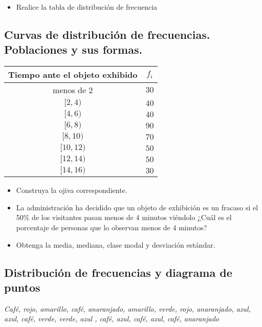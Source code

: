 \documentclass{../oxmathproblems}
\begin{document}
\begin{questions}
\begin{itemize}
\item Realice la tabla de distribución de frecuencia
\end{itemize}

\subsection{Curvas de distribución de frecuencias. Poblaciones y sus formas.}




\begin{tabular}{| c | c |}
\hline
Tiempo ante el objeto exhibido & $f_i$ \\ \hline
menos de 2 & $30$  \\ \hline
$[2,4)$ & $40$  \\ \hline
$[4,6)$ & $40$  \\ \hline
$[6,8)$ & $90$  \\ \hline
$[8,10)$ & $70$  \\ \hline
$[10,12)$ & $50$  \\ \hline
$[12,14)$ & $50$  \\ \hline
$[14,16)$ & $30$  \\ \hline
\end{tabular}

\begin{itemize}
\item Construya la ojiva correspondiente.
\item La administración ha decidido que un objeto de exhibición es un fracaso si el 50\% de los visitantes pasan menos de 4 minutos viéndolo ¿Cuál es el porcentaje de personas que lo observan menos de 4 minutos?
\item Obtenga la media, mediana, clase modal y desviación estándar. 
\end{itemize}


\subsection{Distribución de frecuencias y diagrama de puntos}


\textit{Café, rojo, amarillo, café, anaranjado, amarillo, verde, rojo, anaranjado, azul, azul, café, verde, verde, azul , café, azul, café, azul, café, anaranjado}


\end{questions}
\end{document}
